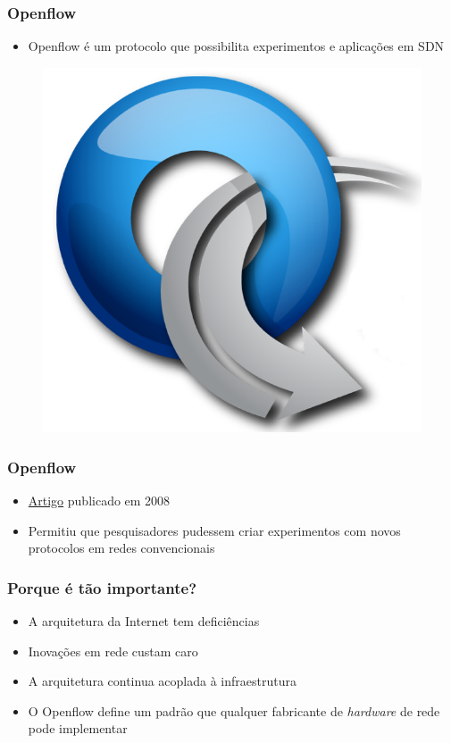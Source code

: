 %
%
\begin{frame}\frametitle{Openflow}

    \begin{itemize}
    \item Openflow é um protocolo que possibilita experimentos e aplicações
          em SDN
    \end{itemize}
    	\begin{figure}[h]
        \centering
        \includegraphics[scale=0.3]{images/openflow.png}
    \end{figure}
\end{frame}


%
%
\begin{frame}\frametitle{Openflow}

    \begin{itemize}
    \item \href{http://archive.openflow.org/documents/openflow-wp-latest.pdf}{Artigo} publicado em 2008 
    \item Permitiu que pesquisadores pudessem criar experimentos com novos
          protocolos em redes convencionais 
    \end{itemize}

\end{frame}




%
%
\begin{frame}\frametitle{Porque é tão importante?}

    \begin{itemize}
    \item A arquitetura da Internet tem deficiências
    \item Inovações em rede custam caro
    \item A arquitetura continua acoplada à infraestrutura
    \item O Openflow define um padrão que qualquer fabricante de     
          \emph{hardware} de rede pode implementar
    \end{itemize}

\end{frame}
